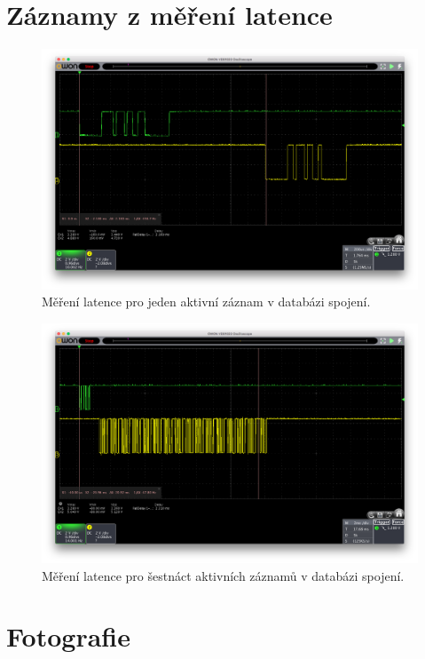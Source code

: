 \chapter{Záznamy z měření latence}
\begin{figure}[h]
	\centering
	\includegraphics[width=.9\textwidth]{obrazky/Mereni_1kanal.png}
	\caption{Měření latence pro jeden aktivní záznam v databázi spojení.}
	\label{fig:Latency1}
\end{figure}
\begin{figure}[h!]
	\centering
	\includegraphics[width=.9\textwidth]{obrazky/Mereni_16kanal.png}
	\caption{Měření latence pro šestnáct aktivních záznamů v databázi spojení.}
	\label{fig:Latency16}
\end{figure}

\chapter{Fotografie}
